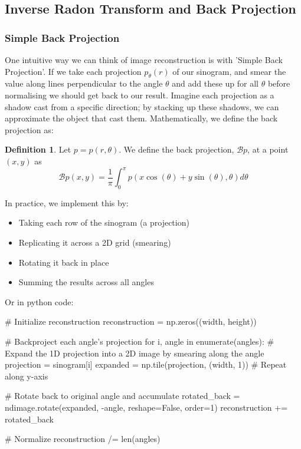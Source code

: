 \documentclass{article}
\theoremstyle{definition}
\newtheorem{definition}{Definition}[section]
\begin{document}
\subsection{Inverse Radon Transform and Back Projection}
\subsubsection{Simple Back Projection}
One intuitive way we can think of image reconstruction is with 'Simple Back Projection'. If we take each projection $p_\theta (r)$ of our sinogram, and smear the value along lines perpendicular to the angle $\theta$ and add these up for all $\theta$ before normalising we should get back to our result. Imagine each projection as a shadow cast from a specific direction; by stacking up these shadows, we can approximate the object that cast them.
Mathematically, we define the back projection as:
\begin{definition}
Let $p = p(r, \theta)$. We define the back projection, $\mathcal{B} p$, at a point $(x,y)$ as
$$
\mathcal{B} p(x,y) = \frac{1}{\pi} \int_{0}^{\pi} p(x \cos(\theta) + y \sin(\theta), \theta) d\theta
$$
\end{definition}

In practice, we implement this by:
\begin{itemize}
	\item Taking each row of the sinogram (a projection)
	\item Replicating it across a 2D grid (smearing)
	\item Rotating it back in place
	\item Summing the results across all angles
\end{itemize}

Or in python code:

\begin{python}
# Initialize reconstruction
reconstruction = np.zeros((width, height))

# Backproject each angle's projection
for i, angle in enumerate(angles):
    # Expand the 1D projection into a 2D image by smearing along the angle
    projection = sinogram[i]
    expanded = np.tile(projection, (width, 1))  # Repeat along y-axis
    
    # Rotate back to original angle and accumulate
    rotated_back = ndimage.rotate(expanded, -angle, reshape=False, order=1)
    reconstruction += rotated_back

# Normalize
reconstruction /= len(angles)
\end{python}
\end{document}
